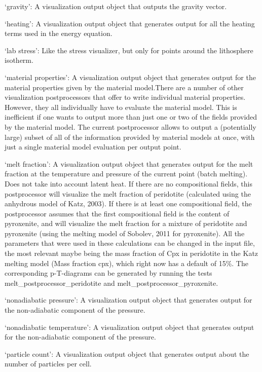 \begin{itemize}
`gravity': A visualization output object that outputs the gravity vector.

`heating': A visualization output object that generates output for all the heating terms used in the energy equation.

`lab stress': Like the stress visualizer, but only for points around the lithosphere isotherm.

`material properties': A visualization output object that generates output for the material properties given by the material model.There are a number of other visualization postprocessors that offer to write individual material properties. However, they all individually have to evaluate the material model. This is inefficient if one wants to output more than just one or two of the fields provided by the material model. The current postprocessor allows to output a (potentially large) subset of all of the information provided by material models at once, with just a single material model evaluation per output point.

`melt fraction': A visualization output object that generates output for the melt fraction at the temperature and pressure of the current point (batch melting). Does not take into account latent heat. If there are no compositional fields, this postprocessor will visualize the melt fraction of peridotite (calculated using the anhydrous model of Katz, 2003). If there is at least one compositional field, the postprocessor assumes that the  first compositional field is the content of pyroxenite, and will visualize the melt fraction for a mixture of peridotite and pyroxenite (using the melting model of Sobolev, 2011 for pyroxenite). All the parameters that were used in these calculations can be changed in the input file, the most relevant maybe being the mass fraction of Cpx in peridotite in the Katz melting model (Mass fraction cpx), which right now has a default of 15\%. The corresponding p-T-diagrams can be generated by running the tests melt\_postprocessor\_peridotite and melt\_postprocessor\_pyroxenite.

`nonadiabatic pressure': A visualization output object that generates output for the non-adiabatic component of the pressure.

`nonadiabatic temperature': A visualization output object that generates output for the non-adiabatic component of the pressure.

`particle count': A visualization output object that generates output about the number of particles per cell.


\end{itemize}
